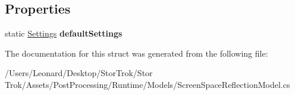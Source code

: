 \subsection*{Properties}
\begin{DoxyCompactItemize}
\item 
\mbox{\label{struct_unity_engine_1_1_post_processing_1_1_screen_space_reflection_model_1_1_settings_a911d8f7c6b2e2dddaea49dc9ae8db8b0}} 
static \hyperlink{struct_unity_engine_1_1_post_processing_1_1_screen_space_reflection_model_1_1_settings}{Settings} {\bfseries default\+Settings}
\end{DoxyCompactItemize}


The documentation for this struct was generated from the following file\+:\begin{DoxyCompactItemize}
\item 
/\+Users/\+Leonard/\+Desktop/\+Stor\+Trok/\+Stor Trok/\+Assets/\+Post\+Processing/\+Runtime/\+Models/Screen\+Space\+Reflection\+Model.\+cs\end{DoxyCompactItemize}
